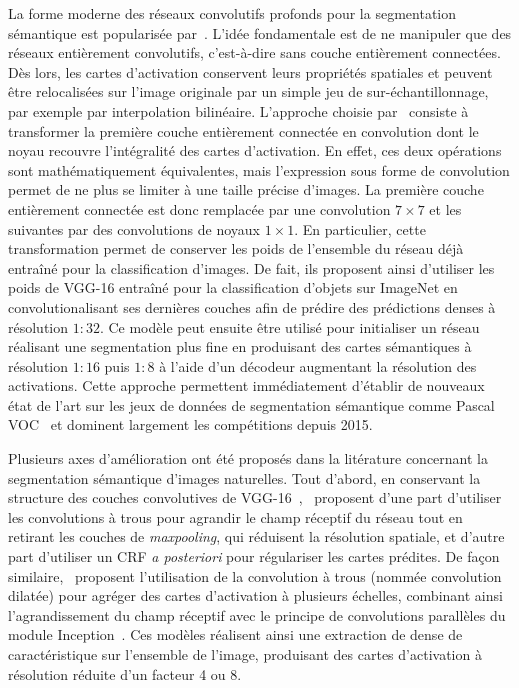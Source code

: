 La forme moderne des réseaux convolutifs profonds pour la segmentation sémantique est popularisée par~\citet{long_fully_2015}. L'idée fondamentale est de ne manipuler que des réseaux entièrement convolutifs, c'est-à-dire sans couche entièrement connectées. Dès lors, les cartes d'activation conservent leurs propriétés spatiales et peuvent être relocalisées sur l'image originale par un simple jeu de sur-échantillonnage, par exemple par interpolation bilinéaire. L'approche choisie par~\citet{long_fully_2015} consiste à transformer la première couche entièrement connectée en convolution dont le noyau recouvre l'intégralité des cartes d'activation. En effet, ces deux opérations sont mathématiquement équivalentes, mais l'expression sous forme de convolution permet de ne plus se limiter à une taille précise d'images. La première couche entièrement connectée est donc remplacée par une convolution $7\times7$ et les suivantes par des convolutions de noyaux $1\times1$. En particulier, cette transformation permet de conserver les poids de l'ensemble du réseau déjà entraîné pour la classification d'images. De fait, ils proposent ainsi d'utiliser les poids de VGG-16 entraîné pour la classification d'objets sur ImageNet en convolutionalisant ses dernières couches afin de prédire des prédictions denses à résolution $1:32$. Ce modèle peut ensuite être utilisé pour initialiser un réseau réalisant une segmentation plus fine en produisant des cartes sémantiques à résolution $1:16$ puis $1:8$ à l'aide d'un décodeur augmentant la résolution des activations. Cette approche permettent immédiatement d'établir de nouveaux état de l'art sur les jeux de données de segmentation sémantique comme Pascal VOC~\cite{everingham_pascal_2014} et dominent largement les compétitions depuis 2015.

Plusieurs axes d'amélioration ont été proposés dans la litérature concernant la segmentation sémantique d'images naturelles. Tout d'abord, en conservant la structure des couches convolutives de VGG-16~\cite{simonyan_very_2014},~\citet{l._c._chen_deeplab_2018} proposent d'une part d'utiliser les convolutions à trous pour agrandir le champ réceptif du réseau tout en retirant les couches de \emph{maxpooling}, qui réduisent la résolution spatiale, et d'autre part d'utiliser un \gls{CRF} \emph{a posteriori} pour régulariser les cartes prédites. De façon similaire,~\citet{yu_multi-scale_2015} proposent l'utilisation de la convolution à trous (nommée convolution dilatée) pour agréger des cartes d'activation à plusieurs échelles, combinant ainsi l'agrandissement du champ réceptif avec le principe de convolutions parallèles du module Inception~\cite{szegedy_going_2015}. Ces modèles réalisent ainsi une extraction de dense de caractéristique sur l'ensemble de l'image, produisant des cartes d'activation à résolution réduite d'un facteur 4 ou 8.

